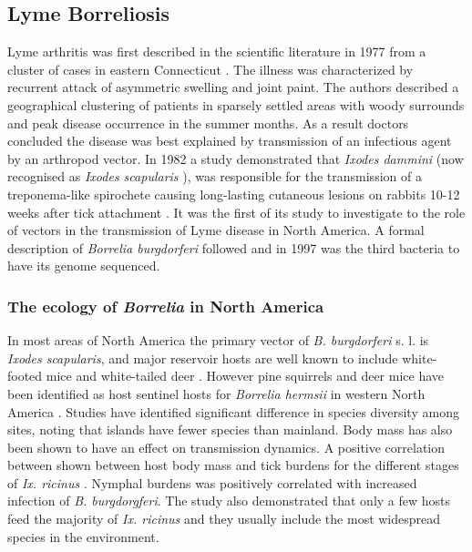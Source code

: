 \documentclass[a4paper, nobind]{templates/ociamthesis}
\begin{document}
\hypertarget{lyme-borreliosis}{%
\subsection{Lyme Borreliosis}\label{lyme-borreliosis}}

Lyme arthritis was first described in the scientific literature in 1977 from a cluster of cases in eastern Connecticut \autocite{steereLymeArthritisEpidemic1977}.
The illness was characterized by recurrent attack of asymmetric swelling and joint paint.
The authors described a geographical clustering of patients in sparsely settled areas with woody surrounds and peak disease occurrence in the summer months.
As a result doctors concluded the disease was best explained by transmission of an infectious agent by an arthropod vector.
In 1982 a study demonstrated that \emph{Ixodes dammini} (now recognised as \emph{Ixodes scapularis} \autocite{sandersIxodesDamminiJunior1998}), was responsible for the transmission of a treponema-like spirochete causing long-lasting cutaneous lesions on rabbits 10-12 weeks after tick attachment \autocite{burgdorferLymeDiseaseTickborne1982}.
It was the first of its study to investigate to the role of vectors in the transmission of Lyme disease in North America.
A formal description of \emph{Borrelia burgdorferi} followed \autocite{johnsonBorreliaBurgdorferiSp1984} and in 1997 \autocite{fraserGenomicSequenceLyme1997} was the third bacteria to have its genome sequenced.

\hypertarget{the-ecology-of-borrelia-in-north-america}{%
\subsubsection{\texorpdfstring{The ecology of \emph{Borrelia} in North America}{The ecology of Borrelia in North America}}\label{the-ecology-of-borrelia-in-north-america}}

In most areas of North America the primary vector of \emph{B. burgdorferi} s. l. is \emph{Ixodes scapularis}, and major reservoir hosts are well known to include white-footed mice and white-tailed deer \autocite{halseyRoleIxodesScapularis2018}.
However pine squirrels and deer mice have been identified as host sentinel hosts for \emph{Borrelia hermsii} in western North America \autocite{cadenasIdentificationHostBloodmeal2007}.
Studies have identified significant difference in species diversity among sites, noting that islands have fewer species than mainland.
Body mass has also been shown to have an effect on transmission dynamics.
A positive correlation between shown between host body mass and tick burdens for the different stages of \emph{Ix. ricinus} \autocite{hofmeesterFewVertebrateSpecies2016}.
Nymphal burdens was positively correlated with increased infection of \emph{B. burgdorgferi}.
The study also demonstrated that only a few hosts feed the majority of \emph{Ix. ricinus} and they usually include the most widespread species in the environment.
\end{document}
